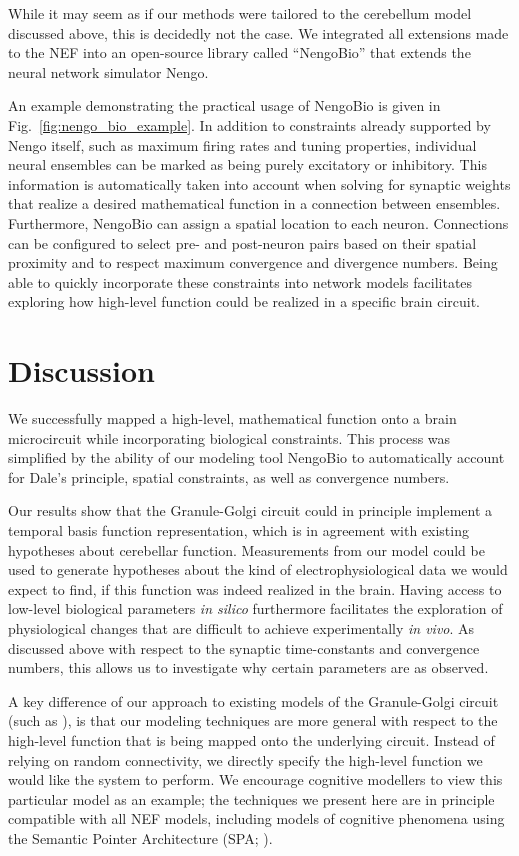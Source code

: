 While it may seem as if our methods were tailored to the cerebellum model discussed above, this is decidedly not the case.
We integrated all extensions made to the NEF into an open-source library called \enquote{NengoBio} that extends the neural network simulator Nengo.

An example demonstrating the practical usage of NengoBio is given in Fig.~\ref{fig:nengo_bio_example}.
In addition to constraints already supported by Nengo itself, such as maximum firing rates and tuning properties, individual neural ensembles can be marked as being purely excitatory or inhibitory.
This information is automatically taken into account when solving for synaptic weights that realize a desired mathematical function in a connection between ensembles.
Furthermore, NengoBio can assign a spatial location to each neuron.
Connections can be configured to select pre- and post-neuron pairs based on their spatial proximity and to respect maximum convergence and divergence numbers.
Being able to quickly incorporate these constraints into network models facilitates exploring how high-level function could be realized in a specific brain circuit.

\section{Discussion}

We successfully mapped a high-level, mathematical function onto a brain microcircuit while incorporating biological constraints.
This process was simplified by the ability of our modeling tool NengoBio to automatically account for Dale's principle, spatial constraints, as well as convergence numbers.

Our results show that the Granule-Golgi circuit could in principle implement a temporal basis function representation, which is in agreement with existing hypotheses about cerebellar function.
Measurements from our model could be used to generate hypotheses about the kind of electrophysiological data we would expect to find, if this function was indeed realized in the brain.
Having access to low-level biological parameters \emph{in silico} furthermore facilitates the exploration of physiological changes that are difficult to achieve experimentally \emph{in vivo}. As discussed above with respect to the synaptic time-constants and convergence numbers, this allows us to investigate why certain parameters are as observed.

A key difference of our approach to existing models of the Granule-Golgi circuit (such as \cite{rossert2015edge}), is that our modeling techniques are more general with respect to the high-level function that is being mapped onto the underlying circuit.
Instead of relying on random connectivity, we directly specify the high-level function we would like the system to perform.
We encourage cognitive modellers to view this particular model as an example; the techniques we present here are in principle compatible with all NEF models, including models of cognitive phenomena using the Semantic Pointer Architecture (SPA; \cite{eliasmith2013how}).

